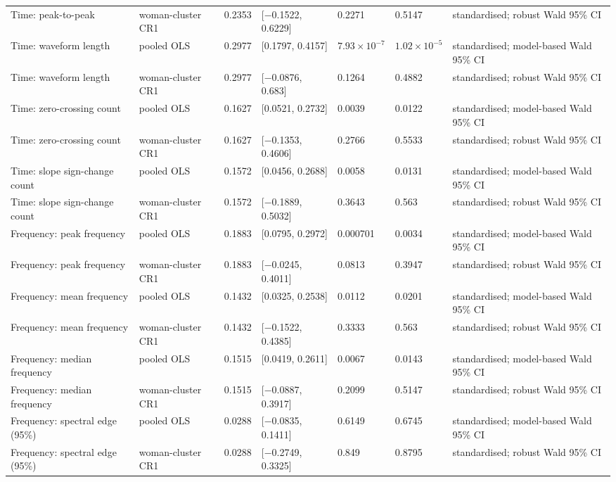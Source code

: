 \documentclass[10pt]{article}
\begin{document}
\begin{landscape}
\begin{longtable}{p{4.0cm}p{3.4cm}p{2.0cm}p{3.4cm}p{1.9cm}p{1.9cm}p{5.2cm}}
Time: peak-to-peak & woman-cluster CR1 & 0.2353 & [$-$0.1522, 0.6229] & 0.2271 & 0.5147 & standardised; robust Wald 95\% CI \\
Time: waveform length & pooled OLS & 0.2977 & [0.1797, 0.4157] & $7.93\times10^{-7}$ & $1.02\times10^{-5}$ & standardised; model-based Wald 95\% CI \\
Time: waveform length & woman-cluster CR1 & 0.2977 & [$-$0.0876, 0.683] & 0.1264 & 0.4882 & standardised; robust Wald 95\% CI \\
Time: zero-crossing count & pooled OLS & 0.1627 & [0.0521, 0.2732] & 0.0039 & 0.0122 & standardised; model-based Wald 95\% CI \\
Time: zero-crossing count & woman-cluster CR1 & 0.1627 & [$-$0.1353, 0.4606] & 0.2766 & 0.5533 & standardised; robust Wald 95\% CI \\
Time: slope sign-change count & pooled OLS & 0.1572 & [0.0456, 0.2688] & 0.0058 & 0.0131 & standardised; model-based Wald 95\% CI \\
Time: slope sign-change count & woman-cluster CR1 & 0.1572 & [$-$0.1889, 0.5032] & 0.3643 & 0.563 & standardised; robust Wald 95\% CI \\
Frequency: peak frequency & pooled OLS & 0.1883 & [0.0795, 0.2972] & 0.000701 & 0.0034 & standardised; model-based Wald 95\% CI \\
Frequency: peak frequency & woman-cluster CR1 & 0.1883 & [$-$0.0245, 0.4011] & 0.0813 & 0.3947 & standardised; robust Wald 95\% CI \\
Frequency: mean frequency & pooled OLS & 0.1432 & [0.0325, 0.2538] & 0.0112 & 0.0201 & standardised; model-based Wald 95\% CI \\
Frequency: mean frequency & woman-cluster CR1 & 0.1432 & [$-$0.1522, 0.4385] & 0.3333 & 0.563 & standardised; robust Wald 95\% CI \\
Frequency: median frequency & pooled OLS & 0.1515 & [0.0419, 0.2611] & 0.0067 & 0.0143 & standardised; model-based Wald 95\% CI \\
Frequency: median frequency & woman-cluster CR1 & 0.1515 & [$-$0.0887, 0.3917] & 0.2099 & 0.5147 & standardised; robust Wald 95\% CI \\
Frequency: spectral edge (95\%) & pooled OLS & 0.0288 & [$-$0.0835, 0.1411] & 0.6149 & 0.6745 & standardised; model-based Wald 95\% CI \\
Frequency: spectral edge (95\%) & woman-cluster CR1 & 0.0288 & [$-$0.2749, 0.3325] & 0.849 & 0.8795 & standardised; robust Wald 95\% CI \\

\end{longtable}
\end{landscape}
\end{document}
